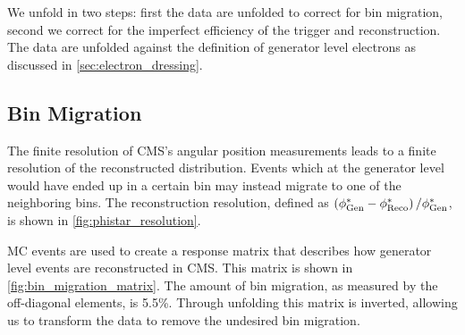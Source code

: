 We unfold in two steps: first the data are unfolded to correct for bin
migration, second we correct for the imperfect efficiency of the trigger and
reconstruction. The data are unfolded against the \dressed definition of
generator level electrons as discussed in \cref{sec:electron_dressing}.

\subsection{Bin Migration}
\label{ssec:bin_migration}

The finite resolution of CMS's angular position measurements leads to a finite
resolution of the reconstructed \phistar distribution. Events which at the
generator level would have ended up in a certain \phistar bin may instead
migrate to one of the neighboring bins. The \phistar reconstruction resolution,
defined as $\left( \phi^{*}_{\text{Gen}} - \phi^{*}_{\text{Reco}} \right) / \phi^{*}_{\text{Gen}}$, is shown
in \cref{fig:phistar_resolution}.

MC events are used to create a response matrix that describes how generator
level events are reconstructed in CMS. This matrix is shown in
\cref{fig:bin_migration_matrix}. The amount of bin migration, as measured
by the off-diagonal elements, is 5.5\%. Through unfolding this matrix is
inverted, allowing us to transform the data to remove the undesired bin
migration.

